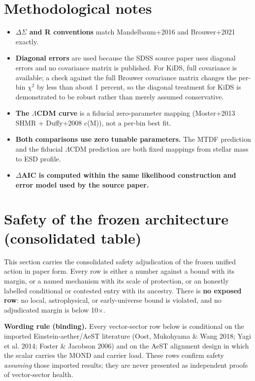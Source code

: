 \documentclass[11pt,a4paper]{article}
\begin{document}
\section{Methodological notes}
\label{sec:notes}
\begin{mdframed}[linecolor=accent,linewidth=0.5pt,backgroundcolor=callout-bg,leftline=true,rightline=true,topline=true,bottomline=true,innerleftmargin=8pt,innerrightmargin=8pt,innertopmargin=6pt,innerbottommargin=6pt]
\begin{itemize}
  \item \textbf{$\Delta$$\Sigma$ and R conventions} match Mandelbaum+2016 and Brouwer+2021 exactly.
  \item \textbf{Diagonal errors} are used because the SDSS source paper uses diagonal errors and no covariance matrix is published. For KiDS, full covariance is available; a check against the full Brouwer covariance matrix changes the per-bin $\chi$$^{2}$ by less than about 1 percent, so the diagonal treatment for KiDS is demonstrated to be robust rather than merely assumed conservative.
  \item \textbf{The $\Lambda$CDM curve} is a fiducial zero-parameter mapping (Moster+2013 SHMR + Duffy+2008 c(M)), not a per-bin best fit.
  \item \textbf{Both comparisons use zero tunable parameters.} The MTDF prediction and the fiducial $\Lambda$CDM prediction are both fixed mappings from stellar mass to ESD profile.
  \item \textbf{$\Delta$AIC is computed within the same likelihood construction and error model used by the source paper.}
\end{itemize}
\end{mdframed}

\section{Safety of the frozen architecture (consolidated table)}
\label{sec:safety}
This section carries the consolidated safety adjudication of the frozen unified action in paper form. Every row is either a number against a bound with its margin, or a named mechanism with its scale of protection, or an honestly labelled conditional or contested entry with its ancestry. There is \textbf{no exposed row}: no local, astrophysical, or early-universe bound is violated, and no adjudicated margin is below 10$\times$.

\begin{mdframed}[linecolor=accent,linewidth=0.5pt,backgroundcolor=callout-bg,leftline=true,rightline=true,topline=true,bottomline=true,innerleftmargin=8pt,innerrightmargin=8pt,innertopmargin=6pt,innerbottommargin=6pt]
\textbf{Wording rule (binding).} Every vector-sector row below is conditional on the imported Einstein-aether/\allowbreak{}AeST literature (Oost, Mukohyama \& Wang 2018; Yagi et al. 2014; Foster \& Jacobson 2006) and on the AeST alignment design in which the scalar carries the MOND and carrier load. These rows confirm safety \emph{assuming} those imported results; they are never presented as independent proofs of vector-sector health.
\end{mdframed}
\end{document}
